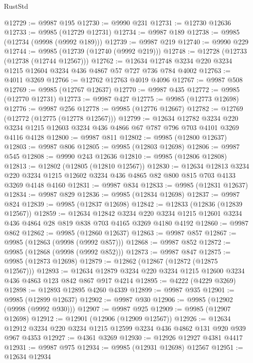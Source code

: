 \begin{lexlean}{RustStd}
\begin{coremodule}
@12729 := @9987 @195
@12730 := @9990 @231
@12731 := @12730 @12636
@12733 := @9985 (@12729 @12731)
@12734 := @9987 @189
@12738 := @9985 (@12734 (@9998 (@9992 @189)))
@12739 := @9987 @219
@12740 := @9990 @229
@12744 := @9985 (@12739 (@12740 (@9992 @219)))
@12748 := @12728 (@12733 (@12738 (@12744 @12567)))
@12762 := @12634 @12748 @3234 @220 @3234 @1215 @12604 @3234 @436 @4867 @57 @727 @736 @784 @4002
@12763 := @4011 @3269
@12766 := @12762 @12763 @4019 @4096
@12767 := @9987 @508
@12769 := @9985 (@12767 @12637)
@12770 := @9987 @435
@12772 := @9985 (@12770 @12731)
@12773 := @9987 @427
@12775 := @9985 (@12773 @12698)
@12776 := @9987 @256
@12778 := @9985 (@12776 @12667)
@12782 := @12769 (@12772 (@12775 (@12778 @12567)))
@12799 := @12634
    @12782
    @3234
    @220
    @3234
    @1215
    @12603
    @3234
    @436
    @4866
    @67
    @787
    @796
    @703
    @4101
    @3269
    @4116
    @4128
@12800 := @9987 @811
@12802 := @9985 (@12800 @12637)
@12803 := @9987 @806
@12805 := @9985 (@12803 @12698)
@12806 := @9987 @545
@12808 := @9990 @243 @12636
@12810 := @9985 (@12806 @12808)
@12813 := @12802 (@12805 (@12810 @12567))
@12830 := @12634
    @12813
    @3234
    @220
    @3234
    @1215
    @12602
    @3234
    @436
    @4865
    @82
    @800
    @815
    @703
    @4133
    @3269
    @4148
    @4160
@12831 := @9987 @834
@12833 := @9985 (@12831 @12637)
@12834 := @9987 @829
@12836 := @9985 (@12834 @12698)
@12837 := @9987 @824
@12839 := @9985 (@12837 @12698)
@12842 := @12833 (@12836 (@12839 @12567))
@12859 := @12634
    @12842
    @3234
    @220
    @3234
    @1215
    @12601
    @3234
    @436
    @4864
    @28
    @819
    @838
    @703
    @4165
    @3269
    @4180
    @4192
@12860 := @9987 @862
@12862 := @9985 (@12860 @12637)
@12863 := @9987 @857
@12867 := @9985 (@12863 (@9998 (@9992 @857)))
@12868 := @9987 @852
@12872 := @9985 (@12868 (@9998 (@9992 @852)))
@12873 := @9987 @847
@12875 := @9985 (@12873 @12698)
@12879 := @12862 (@12867 (@12872 (@12875 @12567)))
@12893 := @12634 @12879 @3234 @220 @3234 @1215 @12600 @3234 @436 @4863 @123 @842 @867 @917 @4214
@12895 := @4222 (@4229 @3269)
@12898 := @12893 @12895 @4260 @4339
@12899 := @9987 @935
@12901 := @9985 (@12899 @12637)
@12902 := @9987 @930
@12906 := @9985 (@12902 (@9998 (@9992 @930)))
@12907 := @9987 @925
@12909 := @9985 (@12907 @12698)
@12912 := @12901 (@12906 (@12909 @12567))
@12926 := @12634 @12912 @3234 @220 @3234 @1215 @12599 @3234 @436 @4862 @131 @920 @939 @967 @4353
@12927 := @4361 @3269
@12930 := @12926 @12927 @4381 @4417
@12931 := @9987 @975
@12934 := @9985 (@12931 @12698) @12567
@12951 := @12634
    @12934

\end{coremodule}
\end{lexlean}

